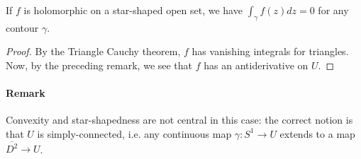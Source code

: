 \begin{corollary}
  If $f$ is holomorphic on a star-shaped open set, we have $\int_\gamma f(z) dz = 0$ for any contour $\gamma$.
\end{corollary}

\begin{proof}
  By the Triangle Cauchy theorem, $f$ has vanishing integrals for triangles. Now, by the preceding remark, we see that $f$ has an antiderivative on $U$.
\end{proof}

\paragraph{Remark}
Convexity and star-shapedness are not central in this case: the correct notion is that $U$ is simply-connected, i.e. any continuous map $\gamma : S^1 \rightarrow U$ extends to a map $\overline{D^2} \rightarrow U$.

